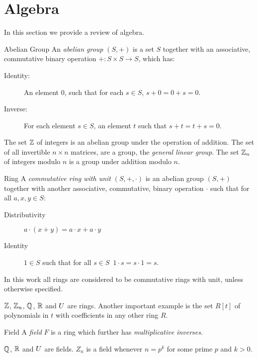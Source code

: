 \section{Algebra}
In this section we provide a review of algebra. 
\begin{definition}{Abelian Group}
An \emph{abelian group} $(S,+)$ is a set $S$ together with an associative, commutative binary operation $+: S \times S \rightarrow S$, which has:
\begin{description}
\item[Identity:] An element $0$, such that for each $s \in S$, $s+0 = 0+s = 0$.
\item[Inverse:] For each element $s \in S$, an element $t$ such that $s+t = t+s = 0$.
\end{description}
\end{definition}
\begin{example}
The set $\mathbb{Z}$ of integers is an abelian group under the operation of addition. The set of all invertible $n \times n$ matrices, are a group, the \emph{general linear group}.
The set $\mathbb{Z}_n$ of integers modulo $n$ is a group under addition modulo $n$.
\end{example}
\begin{definition}{Ring}
A \emph{commutative ring with unit} $(S,+,\cdot)$ is an abelian group $(S,+)$  together with another associative, commutative, binary operation $\cdot$ such that for all $a,x,y \in S$:
\begin{description}
\item[Distributivity] $a \cdot (x + y)  = a \cdot x + a \cdot y$ 
\item[Identity] $1 \in S$ such that for all $s \in S$\, $1 \cdot s = s \cdot 1 = s$. 
\end{description}
\end{definition}
In this work all rings are considered to be commutative rings with unit, unless otherwise specified.  
\begin{example}
$\mathbb{Z}$, $\mathbb{Z}_n$, $\mathbb{Q}$, $\mathbb{R}$ and $U$ are rings. Another important example is the set $R[t]$ of polynomials in $t$ with coefficients in any other ring $R$.
\end{example}
\begin{definition}{Field}
A \emph{field} $F$ is a ring which further has \emph{multiplicative inverses}.
\end{definition}
\begin{example}
$\mathbb{Q}$, $\mathbb{R}$ and $U$ are fields.  $Z_n$ is a field whenever $n = p^k$ for some prime $p$ and $k > 0$.
\end{example}
